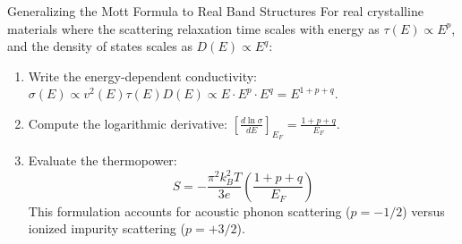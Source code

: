 \documentclass[11pt,a4paper]{article}
\begin{document}
\begin{methodbox}{Generalizing the Mott Formula to Real Band Structures}
For real crystalline materials where the scattering relaxation time scales with energy as $\tau(E) \propto E^p$, and the density of states scales as $D(E) \propto E^q$:
\begin{enumerate}
    \item Write the energy-dependent conductivity: $\sigma(E) \propto v^2(E)\tau(E)D(E) \propto E \cdot E^p \cdot E^q = E^{1+p+q}$.
    \item Compute the logarithmic derivative: $\left[ \frac{d\ln\sigma}{dE} \right]_{E_F} = \frac{1+p+q}{E_F}$.
    \item Evaluate the thermopower:
    \[
    S = -\frac{\pi^2 k_B^2 T}{3e}\left( \frac{1+p+q}{E_F} \right)
    \]
    This formulation accounts for acoustic phonon scattering ($p = -1/2$) versus ionized impurity scattering ($p = +3/2$).
\end{enumerate}
\end{methodbox}

\vspace{0.4cm}
\end{document}
